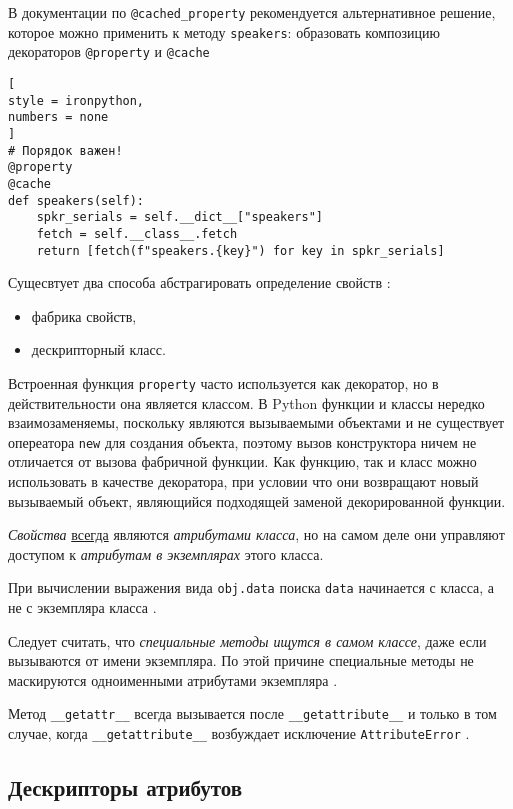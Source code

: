\documentclass[%
	11pt,
	a4paper,
	utf8,
		]{article}
\begin{document}
В документации по \verb*|@cached_property| рекомендуется альтернативное решение, которое можно применить к методу \verb|speakers|: образовать композицию декораторов \verb*|@property| и \verb|@cache|
\begin{lstlisting}[
style = ironpython,
numbers = none
]
# Порядок важен!
@property
@cache
def speakers(self):
    spkr_serials = self.__dict__["speakers"]
    fetch = self.__class__.fetch
    return [fetch(f"speakers.{key}") for key in spkr_serials]
\end{lstlisting}

Сущесвтует два способа абстрагировать определение свойств \cite[]{ramalho:python-2022}:
\begin{itemize}
	\item фабрика свойств,
	
	\item дескрипторный класс.
\end{itemize}

Встроенная функция \verb*|property| часто используется как декоратор, но в действительности она является классом. В Python функции и классы нередко взаимозаменяемы, поскольку являются вызываемыми объектами и не существует опереатора \verb|new| для создания объекта, поэтому вызов конструктора ничем не отличается от вызова фабричной функции. Как функцию, так и класс можно использовать в качестве декоратора, при условии что они возвращают новый вызываемый объект, являющийся подходящей заменой декорированной функции.

\emph{Свойства} \underline{всегда} являются \emph{атрибутами класса}, но на самом деле они управляют доступом к \emph{атрибутам в экземплярах} этого класса.

При вычислении выражения вида \verb*|obj.data| поиска \verb|data| начинается с класса, а не с экземпляра класса \cite[]{ramalho:python-2022}.

Следует считать, что \emph{специальные методы ищутся в самом классе}, даже если вызываются от имени экземпляра. По этой причине специальные методы не маскируются одноименными атрибутами экземпляра \cite[]{ramalho:python-2022}.

Метод \verb*|__getattr__| всегда вызывается после \verb|__getattribute__| и только в том случае, когда \verb*|__getattribute__| возбуждает исключение \verb|AttributeError| \cite[]{ramalho:python-2022}.

\subsection{Дескрипторы атрибутов}
\end{document}
